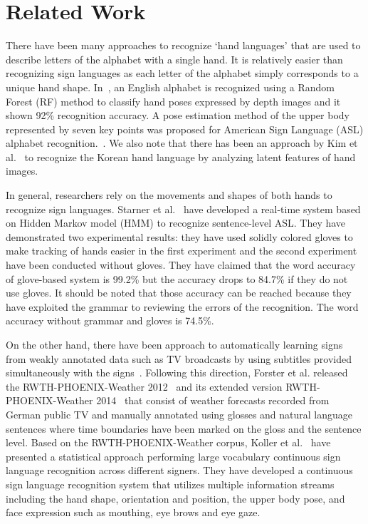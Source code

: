 \documentclass[10pt,twocolumn,letterpaper]{article}
\begin{document}
\section{Related Work}
There have been many approaches to recognize `hand languages' that are used to describe letters of the alphabet with a single hand. It is relatively easier than recognizing sign languages as each letter of the alphabet simply corresponds to a unique hand shape. %
In~\cite{DongLY15}, an English alphabet is recognized using a Random Forest (RF) method to classify hand poses expressed by depth images and it shown 92\% recognition accuracy. A pose estimation method of the upper body represented by seven key points was proposed for American Sign Language (ASL) alphabet recognition.~\cite{gattupalli2016evaluation}. We also note that there has been an approach by Kim et al.~\cite{KimK16} to recognize the Korean hand language by analyzing latent features of hand images.

In general, researchers rely on the movements and shapes of both hands to recognize sign languages. Starner et al.~\cite{StarnerP95} have developed a real-time system based on Hidden Markov model (HMM) to recognize sentence-level ASL. They have demonstrated two experimental results: they have used solidly colored gloves to make tracking of hands easier in the first experiment and the second experiment have been conducted without gloves. They have claimed that the word accuracy of glove-based system is 99.2\% but the accuracy drops to 84.7\% if they do not use gloves. It should be noted that those accuracy can be reached because they have exploited the grammar to reviewing the errors of the recognition. The word accuracy without grammar and gloves is 74.5\%.

On the other hand, there have been approach to automatically learning signs from weakly annotated data such as TV broadcasts by using subtitles provided simultaneously with the signs~\cite{BuehlerZE09,CooperB09,PfisterCZ13}. Following this direction, Forster et al. released the RWTH-PHOENIX-Weather 2012~\cite{ForsterSHKZPN12} and its extended version RWTH-PHOENIX-Weather 2014~\cite{ForsterSKBN14} that consist of weather forecasts recorded from German public TV and manually annotated using glosses and natural language sentences where time boundaries have been marked on the gloss and the sentence level. Based on the RWTH-PHOENIX-Weather corpus, Koller et al.~\cite{KollerFN15} have presented a statistical approach performing large vocabulary continuous sign language recognition across different signers. They have developed a continuous sign language recognition system that utilizes multiple information streams including the hand shape, orientation and position, the upper body pose, and face expression such as mouthing, eye brows and eye gaze.
\end{document}
